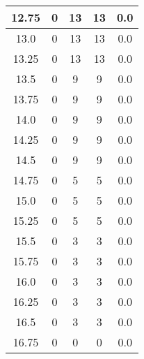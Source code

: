 \documentclass[letterpaper, 12pt]{article}
\begin{document}
\begin{longtable}{|c|c|c|c|c|}
\hline
12.75 & 0 & 13 & 13 & 0.0 \\
\hline
13.0 & 0 & 13 & 13 & 0.0 \\
\hline
13.25 & 0 & 13 & 13 & 0.0 \\
\hline
13.5 & 0 & 9 & 9 & 0.0 \\
\hline
13.75 & 0 & 9 & 9 & 0.0 \\
\hline
14.0 & 0 & 9 & 9 & 0.0 \\
\hline
14.25 & 0 & 9 & 9 & 0.0 \\
\hline
14.5 & 0 & 9 & 9 & 0.0 \\
\hline
14.75 & 0 & 5 & 5 & 0.0 \\
\hline
15.0 & 0 & 5 & 5 & 0.0 \\
\hline
15.25 & 0 & 5 & 5 & 0.0 \\
\hline
15.5 & 0 & 3 & 3 & 0.0 \\
\hline
15.75 & 0 & 3 & 3 & 0.0 \\
\hline
16.0 & 0 & 3 & 3 & 0.0 \\
\hline
16.25 & 0 & 3 & 3 & 0.0 \\
\hline
16.5 & 0 & 3 & 3 & 0.0 \\
\hline
16.75 & 0 & 0 & 0 & 0.0 \\
\hline
\end{longtable}
\end{document}
